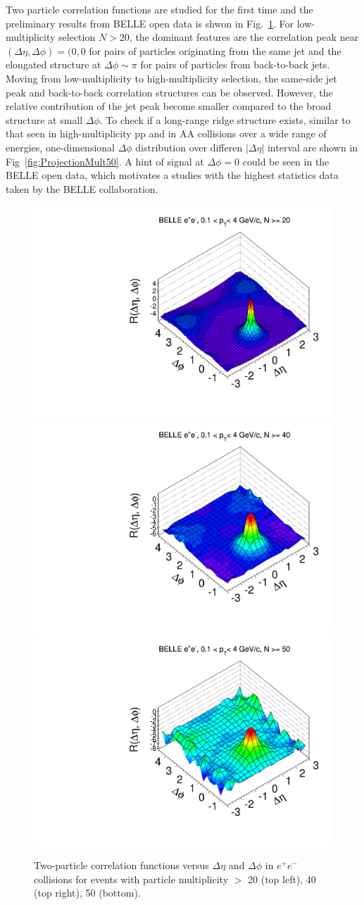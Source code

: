 Two particle correlation functions are studied for the first time and the preliminary results from BELLE open data is shwon in Fig.~\ref{fig:ridgeBelle}. For low-multiplicity selection $N>20$, the dominant features are the correlation peak near $(\Delta\eta,\Delta\phi)=(0,0$ for pairs of particles originating from the same jet and the elongated structure at $\Delta\phi\sim\pi$ for pairs of particles from back-to-back jets. Moving from low-multiplicity to high-multiplicity selection, the same-side jet peak and back-to-back correlation structures can be observed. However, the relative contribution of the jet peak become smaller compared to the broad structure at small $\Delta\phi$. To check if a long-range ridge structure exists, similar to that seen in high-multiplicity pp and in AA collisions over a wide range of energies, one-dimensional $\Delta\phi$ distribution over differen $|\Delta\eta|$ interval are shown in Fig~\ref{fig:ProjectionMult50}. A hint of signal at $\Delta\phi=0$ could be seen in the BELLE open data, which motivates a studies with the highest statistics data taken by the BELLE collaboration.


\begin{figure}[!htb]
\begin{center}
\includegraphics[width=.45\textwidth]{figures/canvasRidgeBelleMult20CutHigh0.pdf}
\includegraphics[width=.45\textwidth]{figures/canvasRidgeBelleMult40CutHigh0.pdf}
\includegraphics[width=.45\textwidth]{figures/canvasRidgeBelleMult50CutHigh0.pdf}
\caption{Two-particle correlation functions versus $\Delta\eta$ and $\Delta\phi$ in $e^{+}e^{-}$ collisions for events with particle multiplicity $>$ 20 (top left), 40 (top right), 50 (bottom).}
\label{fig:ridgeBelle} 
\end{center}
\end{figure}


